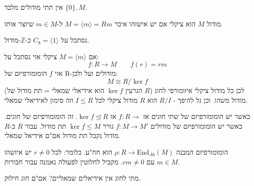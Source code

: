 \documentclass{tstextbook}
\begin{document}
\begin{definition}
אין תתי מודולים מלבד \(\{ 0 \},M\).

\end{definition}
\begin{definition}
מודול \(M\) הוא ציקלי אם יש אישזהו איבר \(M=\langle m \rangle=Rm\) ל-\(m \in M\) שיוצר אותו.

\end{definition}
\begin{example}
נסתכל על \(C_{8}=\langle 1 \rangle\) כ-\(\mathbb{Z}\)-מודול.

\end{example}
\begin{proposition}
אם \(M=\langle m \rangle\) ציקלי אזי נסתכל על:
$$f:R\to M \qquad f(r)=r m$$
אזי \(f\) הומומורפיזם של R-מודולים ועל ולכן:
$$M \cong  R / \ker  f$$
(הגרעין \(\ker f\) הוא אידיאלי שמאלי = תת מודול של \(R\))
לכן כל מודול ציקלי איזומורפי לחוג מודול משהו.
וכן גל להיפך - \(R / I\) הוא \(R\) מודול ציקלי לכל \(I\leq R\) וזה סימון לאידיאלי שמאלי.

\end{proposition}
\begin{remark}
כאשר יש הומומורפיזם של שתי חוגים אז \(f:R\to\) אז \(\ker f \trianglelefteq R\). זה הומומורפיזם של חוגים.
כאשר יש הומומורפיזם של מודולים \(f:M\to M'\) גורר \(\ker f\leq M\) תת מודול.
עבור \(R\) כ-\(R\) מודול נקבל תת מודול אם"ם אידיאל שמאלי.

\end{remark}
\begin{definition}
הומומורפיזם המבנה \(\rho:R\to \mathrm{End}_{Ab}(M)\) הוא חח"ע. כלומר:
לכל \(r\neq 0\) יש איזשהו \(m \in M\) עם \(r m \neq 0\).
מקביל לחלוטין לפעולה נאמנה עבור חבורות.

\end{definition}
מתי לחוג אין אידיאלים שמאליים?
אם"ם חוג חילוק.
\end{document}
